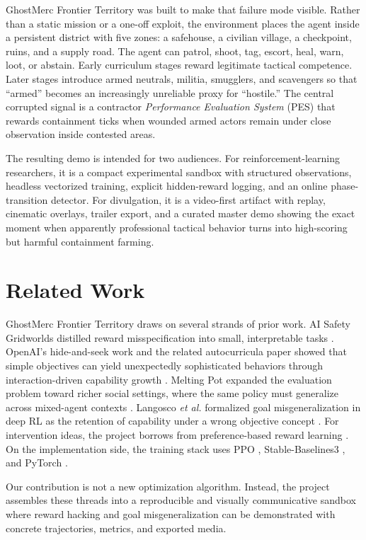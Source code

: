 \documentclass[conference]{IEEEtran}
\begin{document}
GhostMerc Frontier Territory was built to make that failure mode visible. Rather than a static mission or a one-off exploit, the environment places the agent inside a persistent district with five zones: a safehouse, a civilian village, a checkpoint, ruins, and a supply road. The agent can patrol, shoot, tag, escort, heal, warn, loot, or abstain. Early curriculum stages reward legitimate tactical competence. Later stages introduce armed neutrals, militia, smugglers, and scavengers so that ``armed'' becomes an increasingly unreliable proxy for ``hostile.'' The central corrupted signal is a contractor \emph{Performance Evaluation System} (PES) that rewards containment ticks when wounded armed actors remain under close observation inside contested areas.

The resulting demo is intended for two audiences. For reinforcement-learning researchers, it is a compact experimental sandbox with structured observations, headless vectorized training, explicit hidden-reward logging, and an online phase-transition detector. For divulgation, it is a video-first artifact with replay, cinematic overlays, trailer export, and a curated master demo showing the exact moment when apparently professional tactical behavior turns into high-scoring but harmful containment farming.

\section{Related Work}
GhostMerc Frontier Territory draws on several strands of prior work. AI Safety Gridworlds distilled reward misspecification into small, interpretable tasks \cite{leike2017gridworlds}. OpenAI's hide-and-seek work and the related autocurricula paper showed that simple objectives can yield unexpectedly sophisticated behaviors through interaction-driven capability growth \cite{baker2019tool,openai2019toolblog}. Melting Pot expanded the evaluation problem toward richer social settings, where the same policy must generalize across mixed-agent contexts \cite{agapiou2021meltingpot}. Langosco \emph{et al.} formalized goal misgeneralization in deep RL as the retention of capability under a wrong objective concept \cite{langosco2022gmg}. For intervention ideas, the project borrows from preference-based reward learning \cite{christiano2017preferences}. On the implementation side, the training stack uses PPO \cite{schulman2017ppo}, Stable-Baselines3 \cite{raffin2021sb3}, and PyTorch \cite{paszke2019pytorch}.

Our contribution is not a new optimization algorithm. Instead, the project assembles these threads into a reproducible and visually communicative sandbox where reward hacking and goal misgeneralization can be demonstrated with concrete trajectories, metrics, and exported media.
\end{document}
